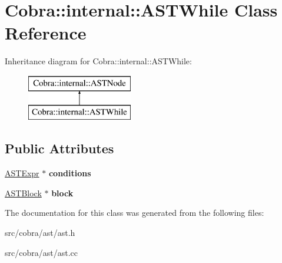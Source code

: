 \hypertarget{class_cobra_1_1internal_1_1_a_s_t_while}{\section{Cobra\+:\+:internal\+:\+:A\+S\+T\+While Class Reference}
\label{class_cobra_1_1internal_1_1_a_s_t_while}
}
Inheritance diagram for Cobra\+:\+:internal\+:\+:A\+S\+T\+While\+:\begin{figure}[H]
\begin{center}
\leavevmode
\includegraphics[height=2.000000cm]{class_cobra_1_1internal_1_1_a_s_t_while}
\end{center}
\end{figure}
\subsection*{Public Attributes}
\begin{DoxyCompactItemize}
\item 
\hypertarget{class_cobra_1_1internal_1_1_a_s_t_while_a8a97bd833a835abb8238263baa3f559b}{\hyperlink{class_cobra_1_1internal_1_1_a_s_t_expr}{A\+S\+T\+Expr} $\ast$ {\bfseries conditions}}\label{class_cobra_1_1internal_1_1_a_s_t_while_a8a97bd833a835abb8238263baa3f559b}

\item 
\hypertarget{class_cobra_1_1internal_1_1_a_s_t_while_a625f9bfdcd435fc72a6bf54cbac8984f}{\hyperlink{class_cobra_1_1internal_1_1_a_s_t_block}{A\+S\+T\+Block} $\ast$ {\bfseries block}}\label{class_cobra_1_1internal_1_1_a_s_t_while_a625f9bfdcd435fc72a6bf54cbac8984f}

\end{DoxyCompactItemize}


The documentation for this class was generated from the following files\+:\begin{DoxyCompactItemize}
\item 
src/cobra/ast/ast.\+h\item 
src/cobra/ast/ast.\+cc\end{DoxyCompactItemize}
